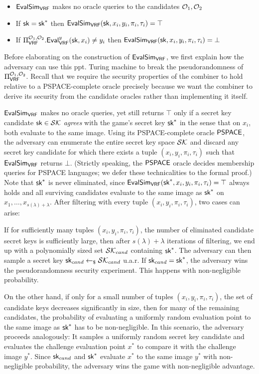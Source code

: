 \begin{itemize}
	\item $\alg{EvalSim}{VRF}$ makes no oracle queries to the candidates $\mathcal{O}_1, \mathcal{O}_2$
	\item If $\textup{\textsf{sk}} = \textup{\textsf{sk}}^*$ then $\alg{EvalSim}{VRF}(\sk, x_i, y_i, \pi_i, \tau_i) = \top$
	\item If $\BBComb{VRF}[\O_1, \O_2].\alg{Eval}{VRF}^y(\sk, x_i) \neq y_i$ then $\alg{EvalSim}{VRF}(\sk, x_i, y_i, \pi_i, \tau_i) = \bot$
\end{itemize}

Before elaborating on the construction of $\alg{EvalSim}{VRF}$, we first explain 
how the adversary can use this ppt. Turing machine to break the pseudorandomness of $\BBComb{VRF}[\O_1, \O_2]$.
Recall that we require the security properties of the combiner to hold relative to a PSPACE-complete oracle
precisely because we want the combiner to derive its security from the candidate oracles rather than implementing it itself.

$\alg{EvalSim}{VRF}$ makes no oracle queries, yet still returns $\top$ only if a secret key candidate $\textup{\textsf{sk}} \in \mathcal{SK}$
\textit{agrees} with the game's secret key $\textup{\textsf{sk}}^*$ in the sense that on $x_i$, both evaluate to the same image.
Using its PSPACE-complete oracle $\textup{\textsf{PSPACE}}$, the adversary can enumerate the entire secret key space $\mathcal{SK}$
and discard any secret key candidate for which there exists a tuple $(x_i, y_i, \pi_i, \tau_i)$
such that $\alg{EvalSim}{VRF}$ returns $\bot$. (Strictly speaking, the $\textup{\textsf{PSPACE}}$ oracle decides membership queries for PSPACE languages;
we defer these technicalities to the formal proof.) Note that $\textup{\textsf{sk}}^*$ is never eliminated, since 
$\alg{EvalSim}{VRF}(\sk^*, x_i, y_i, \pi_i, \tau_i) = \top$ always holds and all surviving candidates evaluate to the same image 
as $\textup{\textsf{sk}}^*$ on $x_1, \ldots, x_{s(\lambda) + \lambda}$.
After filtering with every tuple $(x_i, y_i,\pi_i,\tau_i)$, two cases can arise:

If for sufficiently many tuples $(x_i,y_i,\pi_i,\tau_i)$, the number of eliminated candidate secret keys
is sufficiently large, then after $s(\lambda) + \lambda$
iterations of filtering, we end up with a polynomially sized set $\mathcal{SK}_{cand}$ containing $\textup{\textsf{sk}}^*$.
The adversary can then sample a secret key $\textup{\textsf{sk}}_{cand} \gets_\$ \mathcal{SK}_{cand}$ u.a.r.
If $\textup{\textsf{sk}}_{cand} = \textup{\textsf{sk}}^*$, the adversary wins the pseudorandomness security experiment. This happens with non-negligible probability.

On the other hand, if only for a small number of tuples $(x_i, y_i, \pi_i, \tau_i)$, the set of candidate keys
decreases significantly in size, then for many of the remaining candidates, the probability of evaluating a uniformly random evaluation point to the
same image as $\textup{\textsf{sk}}^*$ has to be non-negligible.
In this scenario, the adversary proceeds analogously: It samples a uniformly random secret key candidate and 
evaluates the challenge evaluation point $x^*$ to compare it with the challenge image $y^*$.
Since $\textup{\textsf{sk}}_{cand}$ and $\textup{\textsf{sk}}^*$ evaluate $x^*$ to the same image $y^*$ with non-negligible probability, 
the adversary wins the game with non-negligible advantage.


